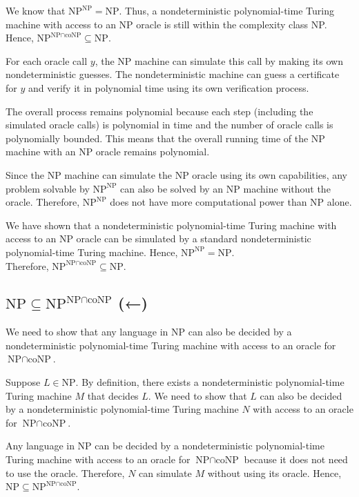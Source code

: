 \documentclass{article}
\begin{document}
We know that \(\text{NP}^\text{NP} = \text{NP}\). Thus, a nondeterministic polynomial-time Turing machine with access to an NP oracle is still within the complexity class NP. Hence, \(\text{NP}^{\text{NP} \cap \text{coNP}} \subseteq \text{NP}\).

For each oracle call \(y\), the NP machine can simulate this call by making its own nondeterministic guesses. The nondeterministic machine can guess a certificate for \(y\) and verify it in polynomial time using its own verification process.

The overall process remains polynomial because each step (including the simulated oracle calls) is polynomial in time and the number of oracle calls is polynomially bounded. This means that the overall running time of the NP machine with an NP oracle remains polynomial.

Since the NP machine can simulate the NP oracle using its own capabilities, any problem solvable by \(\text{NP}^\text{NP}\) can also be solved by an NP machine without the oracle. Therefore, \(\text{NP}^\text{NP}\) does not have more computational power than NP alone.

We have shown that a nondeterministic polynomial-time Turing machine with access to an NP oracle can be simulated by a standard nondeterministic polynomial-time Turing machine. Hence, \(\text{NP}^\text{NP} = \text{NP}\). \\ Therefore, \(\text{NP}^{\text{NP} \cap \text{coNP}} \subseteq \text{NP}\).

\subsection*{\(\text{NP} \subseteq \text{NP}^{\text{NP} \cap \text{coNP}}\) (←)}

We need to show that any language in NP can also be decided by a nondeterministic polynomial-time Turing machine with access to an oracle for \(\text{NP} \cap \text{coNP}\).

Suppose \(L \in \text{NP}\). By definition, there exists a nondeterministic polynomial-time Turing machine \(M\) that decides \(L\). We need to show that \(L\) can also be decided by a nondeterministic polynomial-time Turing machine \(N\) with access to an oracle for \(\text{NP} \cap \text{coNP}\).

Any language in NP can be decided by a nondeterministic polynomial-time Turing machine with access to an oracle for \(\text{NP} \cap \text{coNP}\) because it does not need to use the oracle. Therefore, \(N\) can simulate \(M\) without using its oracle. Hence, \(\text{NP} \subseteq \text{NP}^{\text{NP} \cap \text{coNP}}\).
\end{document}
